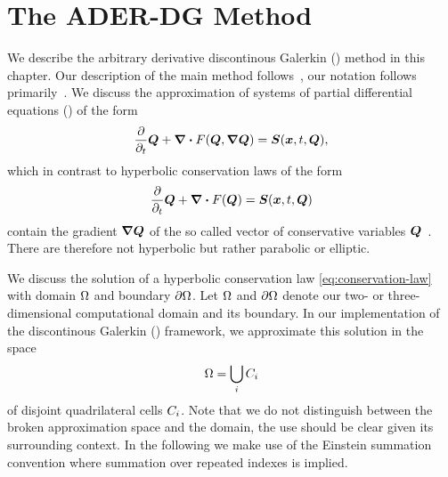 \section{The ADER-DG Method}\label{sec:ader-dg}
We describe the arbitrary derivative discontinous Galerkin (\aderdg) method in this chapter.
Our description of the main method follows~\cite{dumbser2008unified,dumbser2010arbitrary,dumbser2018efficient}, our notation follows primarily~\cite{dumbser2018efficient}.
We discuss the approximation of systems of partial differential equations (\pde) of the form
\begin{equation}
  \label{eq:conservation-law-gradient}
 \frac{\partial}{\partial_t}  \Q + \div \flux(\Q, \gradQ) = \source(\bm{x}, t, \Q),
\end{equation}
which in contrast to hyperbolic conservation laws of the form
\begin{equation}
  \label{eq:conservation-law}
 \frac{\partial}{\partial_t}  \Q + \div \flux(\Q) = \source(\bm{x}, t, \Q)
\end{equation}
contain the gradient $\gradQ$ of the so called vector of conservative variables $\bm{Q}$~\cite{dumbser2010arbitrary}.
There are therefore not hyperbolic but rather parabolic or elliptic.

We discuss the solution of a hyperbolic conservation law \cref{eq:conservation-law} with domain $\Omega$ and boundary $\partial \Omega$.
Let $\Omega$ and $\partial \Omega$ denote our two- or three-dimensional computational domain and its boundary.
In our implementation of the discontinous Galerkin (\dg) framework, we approximate this solution in the space
\begin{equation}
  \label{eq:dg-space}
  \Omega = \bigcup_i C_{i}
\end{equation}
of disjoint quadrilateral cells $C_{i}$.
Note that we do not distinguish between the broken approximation space and the domain, the use should be clear given its surrounding context.
In the following we make use of the Einstein summation convention where summation over repeated indexes is implied.


